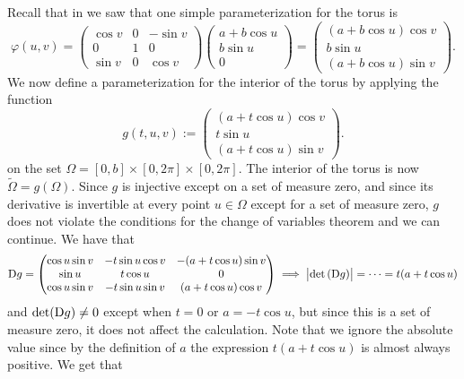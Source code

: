 \documentclass[11pt,a4paper]{article}
\begin{document}
\begin{example}
  \label{exmp:vol-torus}
  Recall that in  we saw that one simple parameterization
  for the torus is
  \[
    \varphi(u,v) =
    \begin{pmatrix}
      \cos v & 0 & - \sin v \\
      0 & 1 & 0 \\
      \sin v & 0 & \cos v
    \end{pmatrix}
    \begin{pmatrix}
      a + b \cos u \\
      b \sin u \\
      0
    \end{pmatrix} =
    \begin{pmatrix}
      (a + b \cos u) \cos v \\
      b \sin u \\
      (a + b \cos u) \sin v
    \end{pmatrix}.
  \]
  We now define a parameterization for the interior of the torus by
  applying the function
  \[
    g(t,u,v) :=
    \begin{pmatrix}
      (a + t \cos u) \cos v \\
      t \sin u \\
      (a + t \cos u) \sin v
    \end{pmatrix}.
  \]
  on the set $\Omega = [0,b] \times [0,2\pi] \times [0,2\pi]$.
  The interior of the torus is now $\widetilde \Omega = g(\Omega)$.
  Since $g$ is injective except on a set of measure zero,
  and since its derivative is invertible at every point $u \in \Omega$
  except for a set of measure zero, $g$ does not violate
  the conditions for the change of variables theorem and we can continue.
  We have that
  \[
    \Dif g =
    \begin{pmatrix}
      \cos u \sin v & -t \sin u \cos v & -(a + t \cos u) \sin v \\
      \sin u & t \cos u & 0 \\
      \cos u \sin v & -t \sin u \sin v & (a + t \cos u) \cos v
    \end{pmatrix} \implies
    \abs{\det\del{\Dif g}} = \cdots = t (a + t \cos u)
  \]
  and $\det(\mathrm{D} g) \neq 0$ except when $t = 0$ or $a = -t \cos u$,
  but since this is a set of measure zero, it does not affect
  the calculation.
  Note that we ignore the absolute value since by the definition
  of $a$ the expression $t (a + t \cos u)$ is almost always positive.
  We get that
  \begin{multline*}

\end{multline*}
\end{example}
\end{document}
